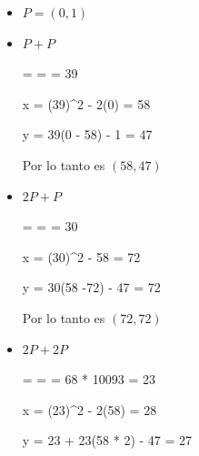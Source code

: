 \documentclass[12pt, fleqn]{report}                             %
\def \Eq {equation}                                             %
\newenvironment{MultiLineEquation*}[1]                          %
        {\begin{\Eq*}\begin{alignedat}{#1}}                         %
        {\end{alignedat}\end{\Eq*}}                                 %
\theoremstyle{break}                                            %
\begin{document}
  \begin{itemize}
    \item $P = (0, 1)$
    \item $P + P$
      \begin{MultiLineEquation*}{3}
          \lambda
            =   
            =      
            = 39     
      \end{MultiLineEquation*}
      \begin{MultiLineEquation*}{3}
        x
          = (39)^2 - 2(0)    
          = 58 
      \end{MultiLineEquation*}
      \begin{MultiLineEquation*}{3}
        y
          = 39(0 - 58) - 1   
          = 47 
      \end{MultiLineEquation*}

      Por lo tanto es $(58, 47)$

    \item $2P + P$
      \begin{MultiLineEquation*}{3}
          \lambda
            =   
            =      
            = 30     
      \end{MultiLineEquation*}
      \begin{MultiLineEquation*}{3}
        x
          = (30)^2 - 58    
          = 72
      \end{MultiLineEquation*}
      \begin{MultiLineEquation*}{3}
        y
          = 30(58 -72) - 47  
          = 72 
      \end{MultiLineEquation*}

      Por lo tanto es $(72, 72)$

    \item $2P + 2P$
      \begin{MultiLineEquation*}{3}
        \lambda
          =   
          =      
          = 68 * 10093      
          = 23     
      \end{MultiLineEquation*}
      \begin{MultiLineEquation*}{3}
        x
          = (23)^2 - 2(58)    
          = 28
      \end{MultiLineEquation*}
      \begin{MultiLineEquation*}{3}
        y
          = 23 + 23(58 * 2) - 47  
          = 27
      \end{MultiLineEquation*}


\end{itemize}
\end{document}
